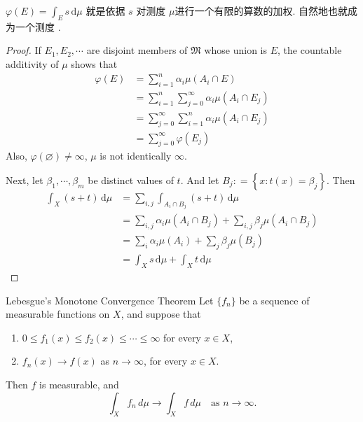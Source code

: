 \documentclass[../main.tex]{subfiles}
\begin{document}
\begin{note}
    \(   \varphi \left( E \right) =  \int_{E}s\,\mathrm{d} \mu    \) 就是依据 \(  s  \) 对测度 \(  \mu   \)进行一个有限的算数的加权.    自然地也就成为一个测度 . 
\end{note}
\begin{proof}
    If  \(  E_1,E_2,\cdots   \) are disjoint members of  \(  \mathfrak{M}  \) whose union is \(  E  \), the countable additivity of \(  \mu   \) shows that  \[
    \begin{aligned}
     \varphi \left( E \right)&= \sum _{i= 1}^{n} \alpha _{i}\mu \left( A_{i}\cap E \right)\\ 
      &=  \sum _{i = 1}^{n}\sum _{j = 0}^{\infty} \alpha _{i}\mu \left( A_{i}\cap E_{j} \right) \\ 
       &= \sum _{j = 0}^{\infty}\sum _{i = 1}^{n}\alpha _{i}\mu \left( A_{i}\cap E_{j} \right)\\ 
        &= \sum _{j = 0}^{\infty} \varphi \left( E_{j} \right) 
    \end{aligned} 
    \] Also, \(   \varphi \left( \varnothing \right)\neq \infty   \), \(  \mu   \) is not identically   \(  \infty  \).  

    Next, let \(  \beta _1 ,\cdots ,\beta _{m}  \) be distinct values of \(  t  \).   And let \(  B_{j}: = \left\{ x: t\left( x \right)= \beta _{j}  \right\}  \). Then \[
    \begin{aligned}
    \int_{X}\left( s+ t \right)\,\mathrm{d} \mu &= \sum _{i,j}\int_{A_{i}\cap B_{j}}\left( s+ t \right)\,\mathrm{d} \mu \\ 
     &= \sum _{i,j}\alpha _{i}\mu \left( A_{i}\cap B_{j} \right)+ \sum _{i,j}\beta _{j}\mu \left( A_{i}\cap B_{j} \right)\\ 
      &=         \sum _{i}\alpha _{i}\mu \left( A_{i} \right)+ \sum _{j}\beta _{j}\mu \left( B_{j} \right)\\ 
       &= \int_{X}s \,\mathrm{d} \mu + \int_{X} t\,\mathrm{d} \mu   
    \end{aligned}
    \] 
\end{proof}

\begin{theorem}{Lebesgue's Monotone Convergence Theorem}{}
Let $\{f_n\}$ be a sequence of measurable functions on $X$, and suppose that
\begin{enumerate}
\item[(a)] $0 \le f_1(x) \le f_2(x) \le \cdots \le \infty$ for every $x \in X$,
\item[(b)] $f_n(x) \to f(x)$ as $n \to \infty$, for every $x \in X$.
\end{enumerate}
Then $f$ is measurable, and
\[
\int_X f_n \, d\mu \to \int_X f \, d\mu \quad \text{as } n \to \infty.
\]
\end{theorem}
\end{document}
